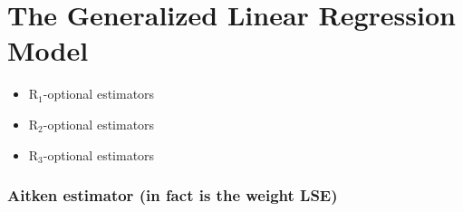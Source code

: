 \documentclass{article}
\begin{document}
\part{The Generalized Linear Regression Model}

\bigskip

\begin{itemize}
\item R$_{1}$-optional estimators

\item R$_{2}$-optional estimators

\item R$_{3}$-optional estimators
\end{itemize}

\section{Aitken estimator (in fact is the weight LSE)}
\end{document}
